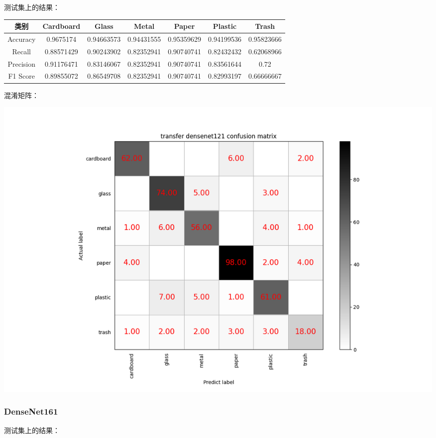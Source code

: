 \documentclass[UTF8]{ctexart}
\begin{document}
测试集上的结果：

\begin{tabular}{|c|c|c|c|c|c|c|}
\hline 
类别 & Cardboard & Glass & Metal & Paper & Plastic & Trash \\ 
\hline 
Accuracy &0.9675174 & 0.94663573& 0.94431555& 0.95359629& 0.94199536& 0.95823666\\
 \hline 
Recall &0.88571429 &0.90243902& 0.82352941& 0.90740741 &0.82432432& 0.62068966\\ 
\hline 
Precision &0.91176471& 0.83146067& 0.82352941& 0.90740741& 0.83561644& 0.72   \\ 
\hline 
F1 Score &0.89855072 &0.86549708& 0.82352941& 0.90740741& 0.82993197& 0.66666667\\ 
\hline 
\end{tabular}

混淆矩阵：

\includegraphics[scale=0.5]{cm/dense121.png} 

\subsubsection{DenseNet161}

测试集上的结果：
\end{document}
